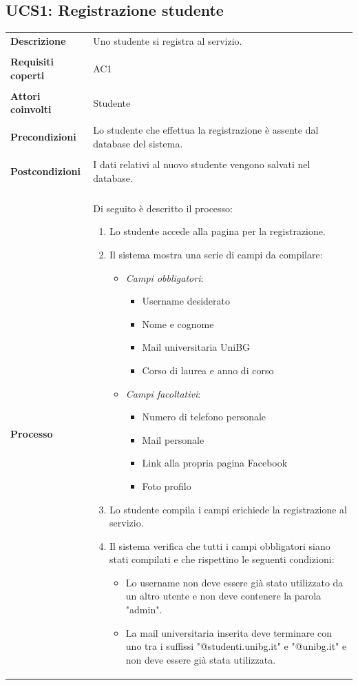 \documentclass[10pt,a4paper]{report}
\begin{document}
	\subsection{UCS1: Registrazione studente}
	\begin{tabular}{lp{}}
		\textbf{Descrizione}&Uno studente si registra al servizio.\\
		\\
		\textbf{Requisiti coperti}&AC1\\
		\\
		\textbf{Attori coinvolti}&Studente\\
		\\
		\textbf{Precondizioni}&Lo studente che effettua la registrazione è assente dal database del sistema.\\
		\\
		\textbf{Postcondizioni}&I dati relativi al nuovo studente vengono salvati nel database.\\
		\\
		\textbf{Processo}&Di seguito è descritto il processo:
		\begin{enumerate}
			\item Lo studente accede alla pagina per la registrazione.
			\item Il sistema mostra una serie di campi da compilare:
			\begin{itemize}
				\item \textit{Campi obbligatori}:
				\begin{itemize}
					\item Username desiderato
					\item Nome e cognome
					\item Mail universitaria UniBG
					\item Corso di laurea e anno di corso
				\end{itemize}
				\item \textit{Campi facoltativi}:
				\begin{itemize}
					\item Numero di telefono personale
					\item Mail personale
					\item Link alla propria pagina Facebook
					\item Foto profilo
				\end{itemize}
			\end{itemize}
			\item Lo studente compila i campi erichiede la registrazione al servizio.
			\item Il sistema verifica che tutti i campi obbligatori siano stati compilati e che rispettino le seguenti condizioni:
			\begin{itemize}
				\item Lo username non deve essere già stato utilizzato da un altro utente e non deve contenere la parola "admin".
				\item La mail universitaria inserita deve terminare con uno tra i suffissi "@studenti.unibg.it" e "@unibg.it" e non deve essere già stata utilizzata.
			\end{itemize}
		\end{enumerate}
	\end{tabular}
\end{document}

